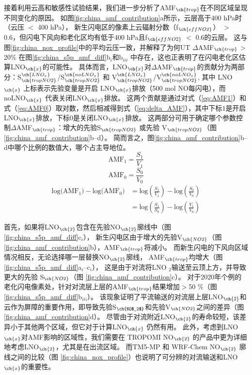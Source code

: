 接着利用云高和敏感性试验结果，我们进一步分析了AMF$_{\ch{trop}}$在不同区域呈现不同变化的原因。
如图\ref{fig:china_amf_contribution}a所示，云层高于400 hPa时（云压 $<$ 400 hPa），
新生闪电区的像素上云辐射分数（f$_{\ch{effNO2}}$） $>$ 0.6，但闪电下风向和老化区均有低于400 hPa且f$_{\ch{effNO2}}$ $<$ 0.6的云层。
这与图\ref{fig:china_nox_profile}中的平均云压一致，并解释了为何UT $\Delta$AMF$_{\ch{trop}}$ > 20\% 在图\ref{fig:china_s5p_amf_diff}b$_i$和b$_{iii}$ 中存在，这也正表明了在闪电老化区估算LNO$_{\ch{x}}$的可能性。
具体而言，LNO$_{\ch{x}}$对$\Delta$AMF$_{\ch{trop}}$的贡献分为两部分：S$^{\ch{LNO_x}}_{\ch{tropNO2}}$/S$^{\ch{noLNO_x}}_{\ch{tropNO2}}$ 和 V$^{\ch{LNO_x}}_{\ch{tropNO2}}$/V$^{\ch{noLNO_x}}_{\ch{tropNO2}}$,
其中 LNO$_{\ch{x}}$ 上标表示先验变量是开启 LNO$_{\ch{x}}$排放（500 mol NO每闪电），而 noLNO$_{\ch{x}}$ 代表关闭LNO$_{\ch{x}}$排放。
这两个贡献是通过对式（\ref{eq:AMF1}）和式（\ref{eq:AMF0}）取对数，然后相减得到式（\ref{eq:delta_AMF}），其中下标$1$是开启LNO$_{\ch{x}}$排放，下标$0$是关闭LNO$_{\ch{x}}$排放。
这两部分可用于确定哪个参数控制$\Delta$AMF$_{\ch{trop}}$：增大的先验S$_{\ch{tropNO2}}$ 或先验 V$_{\ch{tropNO2}}$（图\ref{fig:china_amf_contribution}b--d）。
简而言之，图\ref{fig:china_amf_contribution}b--d中哪个比例的数值大，哪个占主导地位。
{
\abovedisplayskip=5pt%
\belowdisplayskip=5pt%
\begin{equation} \label{eq:AMF1}
\textrm{AMF}_1 = \frac{S_1}{V_1}
\end{equation}
\begin{equation} \label{eq:AMF0}
\textrm{AMF}_0 = \frac{S_0}{V_0}
\end{equation}
\begin{equation} \label{eq:delta_AMF}
\begin{split}
\textrm{log(AMF$_1$)} - \textrm{log(AMF$_0$)} & = \textrm{log}(\frac{S_1}{V_1}) - \textrm{log}(\frac{S_0}{V_0}) \\
                                              & = \textrm{log}(\frac{S_1}{S_0}) - \textrm{log}(\frac{V_1}{V_0})
\end{split}
\end{equation}
}

首先，如果将LNO$_{\ch{2}}$包含在先验NO$_{\ch{2}}$廓线中（图\ref{fig:china_s5p_amf_diff}c$_i$），
新生闪电区由于增大的先验V$_{\ch{NO2}}$（图 \ref{fig:china_amf_contribution}b），AMF$_{\ch{trop}}$将减小。
而新生闪电的下风向区域情况相反，无论选择哪一层替换NO$_{\ch{2}}$廓线，
AMF$_{\ch{trop}}$均增大（图\ref{fig:china_s5p_amf_diff}a$_{i}$--c$_{i}$），
这是由于对流将LNO $_2$输送至云顶上方，并导致更大的先验 S$_{\ch{NO2}}$（图 \ref{fig:china_amf_contribution}c）。
对于2020年个例的老化闪电像素处，针对对流层上层的AMF$_{\ch{trop}}$结果增加$>$50 \%（图\ref{fig:china_s5p_amf_diff}b$_{iii}$）。
该现象证明了平流输送的对流层上层LNO$_{\ch{2}}$和云作为屏障的重要作用，即导致先验S$_{\ch{NO$_2$}}$和先验V$_{\ch{NO2}}$之间的差异（图 \ref{fig:china_amf_contribution}d）。
尽管由于对流附近LNO$_{\ch{2}}$的寿命较短，该差异小于其他两个区域，但它对于计算LNO$_{\ch{x}}$ 仍然有用。
此外，考虑到LNO$_{\ch{x}}$对AMF影响的区域性，我们需要在 TROPOMI NO$_{\ch{2}}$ 的产品中更为详细地考虑LNO$_{\ch{2}}$，尤其是在出流区域。
而TM5-MP 和 WRF-Chem NO$_{\ch{2}}$ 廓线之间的比较（图 \ref{fig:china_nox_profile}）也说明了可分辨的对流输送和LNO$_{\ch{x}}$的重要性。


